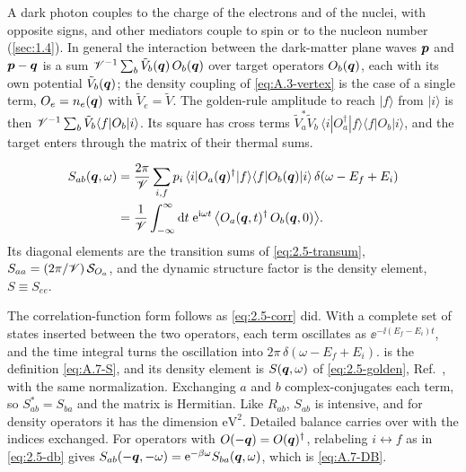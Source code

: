 A dark photon couples to the charge of the electrons and of the nuclei, with opposite signs, and other mediators couple to spin or to the nucleon number (\cref{sec:1.4}). In general the interaction between the dark-matter plane waves $\bm{p}$ and $\bm{p} - \bm{q}$ is a sum $\mathscr{V}^{-1}\sum_b\tilde V_b(\bm{q})\,O_b(\bm{q})$ over target operators $O_b(\bm{q})$, each with its own potential $\tilde V_b(\bm{q})$; the density coupling of \cref{eq:A.3-vertex} is the case of a single term, $O_e = n_e(\bm{q})$ with $\tilde V_e = \tilde V$. The golden-rule amplitude to reach $|f\rangle$ from $|i\rangle$ is then $\mathscr{V}^{-1}\sum_b\tilde V_b\langle f|O_b|i\rangle$. Its square has cross terms $\tilde V_a^*\tilde V_b\,\langle i|O_a^\dagger|f\rangle\langle f|O_b|i\rangle$, and the target enters through the matrix of their thermal sums.
\begin{keyresult}
\begin{equation}
  \begin{aligned}
  S_{ab}(\bm{q},\omega) &= \frac{2\pi}{\mathscr{V}}\sum_{i,f}p_i\,\langle i|O_a(\bm{q})^\dagger|f\rangle\langle f|O_b(\bm{q})|i\rangle\,\delta(\omega - E_f + E_i) \\
  &= \frac{1}{\mathscr{V}}\int_{-\infty}^{\infty}\mathrm{d} t\;\mathrm{e}^{\mathrm{i}\omega t}\,\bigl\langle O_a(\bm{q},t)^\dagger\,O_b(\bm{q},0)\bigr\rangle .
  \end{aligned}
  \label{eq:4.2-Sab}
\end{equation}
Its diagonal elements are the transition sums of \cref{eq:2.5-transum}, $S_{aa} = (2\pi/\mathscr{V})\,\mathcal{S}_{O_a}$, and the dynamic structure factor is the density element, $S \equiv S_{ee}$.
\end{keyresult}
The correlation-function form follows as \cref{eq:2.5-corr} did. With a complete set of states inserted between the two operators, each term oscillates as $\ee^{-\ii(E_f - E_i)t}$, and the time integral turns the oscillation into $2\pi\,\delta(\omega - E_f + E_i)$.  is the definition \cref{eq:A.7-S}, and its density element is $S(\bm{q},\omega)$ of \cref{eq:2.5-golden}, Ref.~\cite[Eq.~(4)]{knapen2021dark}, with the same normalization. Exchanging $a$ and $b$ complex-conjugates each term, so $S_{ab}^* = S_{ba}$ and the matrix is Hermitian. Like $R_{ab}$, $S_{ab}$ is intensive, and for density operators it has the dimension $\mathrm{eV}^2$. Detailed balance carries over with the indices exchanged. For operators with $O(-\bm{q}) = O(\bm{q})^\dagger$, relabeling $i \leftrightarrow f$ as in \cref{eq:2.5-db} gives $S_{ab}(-\bm{q},-\omega) = \mathrm{e}^{-\beta\omega}S_{ba}(\bm{q},\omega)$, which is \cref{eq:A.7-DB}.

